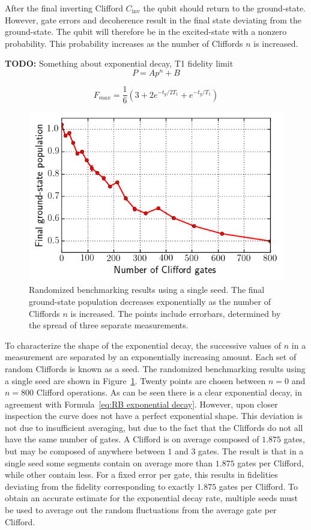       After the final inverting Clifford $C_\text{inv}$ the qubit should return to the ground-state. However, gate errors and decoherence result in the final state deviating from the ground-state. The qubit will therefore be in the excited-state with a nonzero probability. This probability increases as the number of Cliffords $n$ is increased.

      \textbf{TODO:} Something about exponential decay, T1 fidelity limit
      \begin{equation}
        P= A p^n + B
        \label{eq:RB exponential decay}
      \end{equation}

      \begin{equation}
        F_{max} = \frac{1}{6}\left(3 + 2 e^{-t_g/2 T_1} + e^{-t_g/T_1}\right)
        \label{eq:RB T1 fidelity limit}
      \end{equation}

      \begin{figure}[tb]
        \centering
        \includegraphics[width=.6\textwidth]{../Figures/Randomized benchmarking/RB_single_seed.png}
        \caption{Randomized benchmarking results using a single seed. The final ground-state population decreases exponentially as the number of Cliffords $n$ is increased. The points include errorbars, determined by the spread of three separate measurements.}
        \label{fig:RB single seed}
      \end{figure}

      To characterize the shape of the exponential decay, the successive values of $n$ in a measurement are separated by an exponentially increasing amount. Each set of random Cliffords is known as a seed. The randomized benchmarking results using a single seed are shown in Figure~\ref{fig:RB single seed}. Twenty points are chosen between $n=0$ and $n=800$ Clifford operations. As can be seen there is a clear exponential decay, in agreement with Formula~\ref{eq:RB exponential decay}. However, upon closer inspection the curve does not have a perfect exponential shape. This deviation is not due to insufficient averaging, but due to the fact that the Cliffords do not all have the same number of gates. A Clifford is on average composed of $1.875$ gates, but may be composed of anywhere between $1$ and $3$ gates. The result is that in a single seed some segments contain on average more than $1.875$ gates per Clifford, while other contain less. For a fixed error per gate, this results in fidelities deviating from the fidelity corresponding to exactly $1.875$ gates per Clifford. To obtain an accurate estimate for the exponential decay rate, multiple seeds must be used to average out the random fluctuations from the average gate per Clifford.

